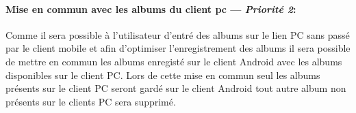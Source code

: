 \paragraph{Mise en commun avec les albums du client pc ---  \textit{Priorité 2}:} 
Comme il sera possible à l'utilisateur d'entré des albums sur le lien PC sans passé par le client mobile et afin d'optimiser l'enregistrement des albums il sera possible de mettre en commun les albums enregisté sur le client Android avec les albums disponibles sur le client PC.
Lors de cette mise en commun seul les albums présents sur le client PC seront gardé sur le client Android tout autre album non présents sur le clients PC sera supprimé.  

